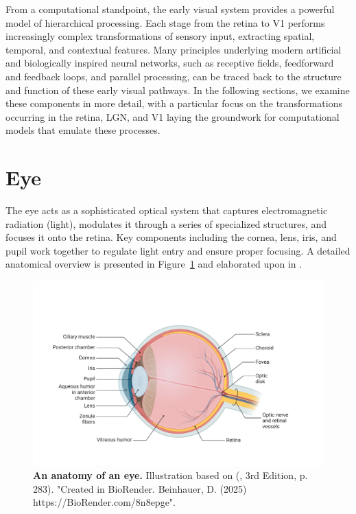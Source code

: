 From a computational standpoint, the early visual system provides a powerful model of hierarchical processing. Each stage from the retina to V1 performs increasingly complex transformations of sensory input, extracting spatial, temporal, and contextual features. Many principles underlying modern artificial and biologically inspired neural networks, such as receptive fields, feedforward and feedback loops, and parallel processing, can be traced back to the structure and function of these early visual pathways. In the following sections, we examine these components in more detail, with a particular focus on the transformations occurring in the retina, LGN, and V1 laying the groundwork for computational models that emulate these processes.

\section{Eye}
\label{sec:eye}

The eye acts as a sophisticated optical system that captures electromagnetic radiation (light), modulates it through a series of specialized structures, and focuses it onto the retina. Key components including the cornea, lens, iris, and pupil work together to regulate light entry and ensure proper focusing. A detailed anatomical overview is presented in Figure~\ref{fig:eye} and elaborated upon in \citet{snell2013clinical}.

\begin{figure}
    \centering
    \includegraphics[width=\linewidth]{img/eye.pdf}
    \caption{\textbf{An anatomy of an eye.} Illustration based on (\citet{bear2020neuroscience}, 3rd Edition, p. 283). "Created in BioRender. Beinhauer, D. (2025) https://BioRender.com/8n8epge".}
    \label{fig:eye}
\end{figure}


